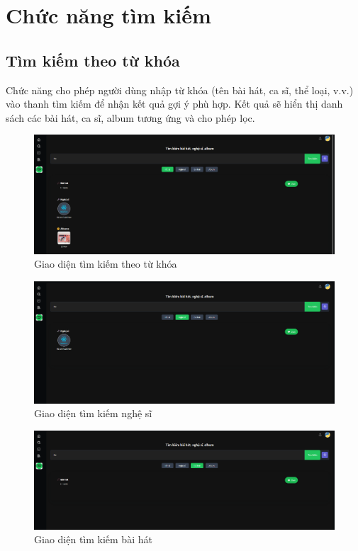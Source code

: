 \section{Chức năng tìm kiếm}
\subsection{Tìm kiếm theo từ khóa}
Chức năng cho phép người dùng nhập từ khóa (tên bài hát, ca sĩ, thể loại, v.v.) vào thanh tìm kiếm để nhận kết quả gợi ý phù hợp. Kết quả sẽ hiển thị danh sách các bài hát, ca sĩ, album tương ứng và cho phép lọc.
\begin{figure}[H]
    \centering
    \includegraphics[width=1\textwidth]{imgs/chap5/tim_kiem_1.png}
    \caption{Giao diện tìm kiếm theo từ khóa}
\end{figure}

\begin{figure}[H]
    \centering
    \includegraphics[width=1\textwidth]{imgs/chap5/tim_kiem_2.png}
    \caption{Giao diện tìm kiếm nghệ sĩ}
\end{figure}

\begin{figure}[H]
    \centering
    \includegraphics[width=1\textwidth]{imgs/chap5/tim_kiem_3.png}
    \caption{Giao diện tìm kiếm bài hát}
\end{figure}

